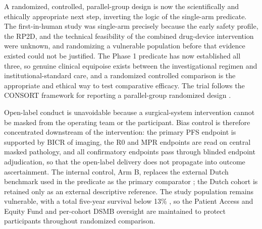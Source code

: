 A randomized, controlled, parallel-group design is now the scientifically and
ethically appropriate next step, inverting the logic of the single-arm predicate.
The first-in-human study was single-arm precisely because the early safety profile,
the RP2D, and the technical feasibility of the combined drug-device intervention
were unknown, and randomizing a vulnerable population before that evidence existed
could not be justified. The Phase 1 predicate \cite{kawchak2026phase1} has now
established all three, so genuine clinical equipoise exists between the
investigational regimen and institutional-standard care, and a randomized
controlled comparison is the appropriate and ethical way to test comparative
efficacy. The trial follows the CONSORT framework for reporting a parallel-group
randomized design \cite{Schulz2010consort}.

Open-label conduct is unavoidable because a surgical-system intervention cannot be
masked from the operating team or the participant. Bias control is therefore
concentrated downstream of the intervention: the primary PFS endpoint is supported
by BICR of imaging, the R0 and MPR endpoints are read on central masked pathology,
and all confirmatory endpoints pass through blinded endpoint adjudication, so that
the open-label delivery does not propagate into outcome ascertainment. The internal
control, Arm B, replaces the external Dutch benchmark used in the predicate as the
primary comparator \cite{DutchCohort2025}; the Dutch cohort is retained only as an
external descriptive reference. The study population remains vulnerable, with a
total five-year survival below 13\% \cite{Siegel2025}, so the Patient Access and
Equity Fund and per-cohort DSMB oversight are maintained to protect participants
throughout randomized comparison.

